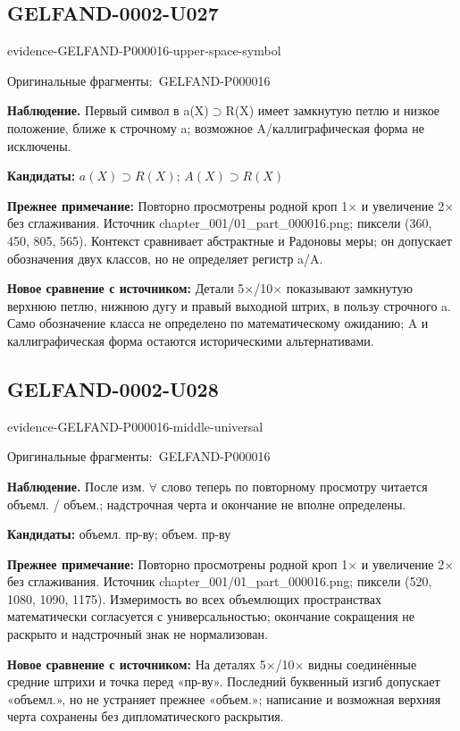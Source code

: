 \documentclass[11pt]{article}
\newcommand{\EvidenceBlock}[4]{%
 \par\smallskip\noindent\begin{minipage}{\linewidth}
 \begin{minipage}[t]{.47\linewidth}\vspace{0pt}\centering
 \csname evidence-#1-#2\endcsname\par
 {\scriptsize\SourceCropCaption\ #1}\par
 \end{minipage}\hfill
 \begin{minipage}[t]{.49\linewidth}\vspace{0pt}\raggedright
 {\small\color{orange!65!black}\textbf{#4} #3}\par
 \end{minipage}
 \end{minipage}\par\smallskip}
\newcommand{\SourceCropCaption}{Оригинальные фрагменты:}\newcommand{\ReadingCaption}{Сомнительное чтение.}\newcommand{\IncompleteCaption}{Неразобранный фрагмент.}\newcommand{\DiagramCaption}{Рисунок и набранное описание.}
\begin{document}
\subsection*{GELFAND-0002-U027}
\EvidenceBlock{GELFAND-P000016}{upper-space-symbol}{Первый символ в a(X)\(\supset\)R(X) имеет замкнутую петлю и низкое положение, ближе к строчному a; возможное A/каллиграфическая форма не исключены.}{Наблюдение.}
\par\smallskip\noindent\textbf{Кандидаты: } \(a(X)\supset R(X)\); \(A(X)\supset R(X)\)\par
\par\smallskip\noindent\textbf{Прежнее примечание: } Повторно просмотрены родной кроп 1× и увеличение 2× без сглаживания. Источник chapter\_001/01\_part\_000016.png; пиксели (360, 450, 805, 565). Контекст сравнивает абстрактные и Радоновы меры; он допускает обозначения двух классов, но не определяет регистр a/A.\par
\par\smallskip\noindent\textbf{Новое сравнение с источником: } Детали 5×/10× показывают замкнутую верхнюю петлю, нижнюю дугу и правый выходной штрих, в пользу строчного a. Само обозначение класса не определено по математическому ожиданию; A и каллиграфическая форма остаются историческими альтернативами.\par

\subsection*{GELFAND-0002-U028}
\EvidenceBlock{GELFAND-P000016}{middle-universal}{После изм. \(\forall\) слово теперь по повторному просмотру читается объемл. / объем.; надстрочная черта и окончание не вполне определены.}{Наблюдение.}
\par\smallskip\noindent\textbf{Кандидаты: } объемл. пр-ву; объем. пр-ву\par
\par\smallskip\noindent\textbf{Прежнее примечание: } Повторно просмотрены родной кроп 1× и увеличение 2× без сглаживания. Источник chapter\_001/01\_part\_000016.png; пиксели (520, 1080, 1090, 1175). Измеримость во всех объемлющих пространствах математически согласуется с универсальностью; окончание сокращения не раскрыто и надстрочный знак не нормализован.\par
\par\smallskip\noindent\textbf{Новое сравнение с источником: } На деталях 5×/10× видны соединённые средние штрихи и точка перед «пр-ву». Последний буквенный изгиб допускает «объемл.», но не устраняет прежнее «объем.»; написание и возможная верхняя черта сохранены без дипломатического раскрытия.\par
\end{document}
